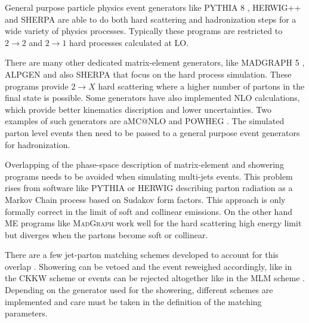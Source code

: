 General purpose particle physics event generators like \textsc{PYTHIA 8} \cite{ARTICLE:Pythia6p4PhysicsAndManual,ARTICLE:Pythia8p1Introduction}, \textsc{HERWIG++} \cite{ARTICLE:HERWIGPhysicsAndManual} and \textsc{SHERPA} \cite{ARTiCLE:SherpaEventGenerator} are able to do both hard scattering and hadronization steps for a wide variety of physics processes. Typically these programs are restricted to $2 \rightarrow 2$ and $2 \rightarrow 1$ hard processes calculated at \gls{LO}.

There are many other dedicated matrix-element generators, like \textsc{MADGRAPH 5} \cite{ARTICLE:MadGraph5}, \textsc{ALPGEN} \cite{ARTICLE:ALPGENGenerator} and also \textsc{SHERPA} that focus on the hard process simulation. These programs provide $2 \rightarrow X$ hard scattering where a higher number of partons in the final state is possible. Some generators have also implemented \gls{NLO} calculations, which provide better kinematics discription and lower uncertainties. Two examples of such generators are a\textsc{MC@NLO} \cite{ARTICLE:aMCatNLO} and \textsc{POWHEG} \cite{ARTICLE:POWHEG_2004,ARTICLE:POWHEG_2007,ARTICLE:POWHEG_2009v1,ARTICLE:POWHEG_2009v2,ARTICLE:POWHEG_2010v1,ARTICLE:POWHEG_2010v2,ARTICLE:POWHEG_2011v1,ARTICLE:POWHEG_2011v2}. The simulated parton level events then need to be passed to a general purpose event generators for hadronization. 

Overlapping of the phase-space description of matrix-element and showering programs needs to be avoided when simulating multi-jets events. This problem rises from software like \textsc{PYTHIA} or \textsc{HERWIG} describing parton radiation as a Markov Chain process based on Sudakov form factors. This approach is only formally correct in the limit of soft and collinear emissions. On the other hand \gls{ME} programs like \textsc{MadGraph} work well for the hard scattering high energy limit but diverges when the partons become soft or collinear. 

There are a few jet-parton matching schemes developed to account for this overlap \cite{ARTICLE:MatchingPartonShowersAndMatrixElements}. Showering can be vetoed and the event reweighed accordingly, like in the CKKW scheme \cite{ARTICLE:CKKWSchemeRef1,ARTICLE:CKKWSchemeRef2,ARTICLE:CKKWSchemeRef3} or events can be rejected altogether like in the MLM scheme \cite{ARTICLE:MLMScheme}. Depending on the generator used for the showering, different schemes are implemented and care must be taken in the definition of the matching parameters.

